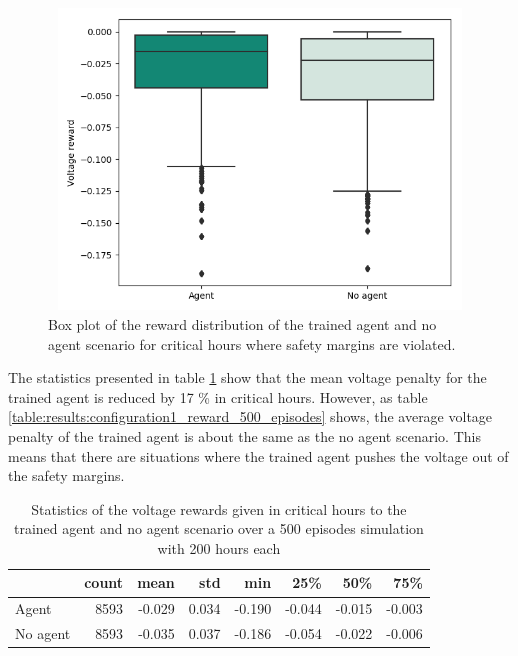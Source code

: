 \documentclass[class=book, crop=false]{standalone}
\begin{document}
\begin{figure}[H]
    \center
\includegraphics[height=8cm, width=12cm]{figures/config1_voltage_boxplot.png}
    \caption[size = 9]{Box plot of the reward distribution of the trained agent and no agent scenario for critical hours where safety margins are violated.}
    \label{fig:results:config1_voltage_boxplot}
\end{figure}

The statistics presented in table \ref{table:results:configuration1_reward_500_ep_preventive} show that the mean voltage penalty for the trained agent is reduced by 17 \% in critical hours. However, as table
\ref{table:results:configuration1_reward_500_episodes} shows, the average voltage penalty of the trained agent is about the same as the no agent scenario. This means that there are situations where the trained agent pushes the voltage out of the safety margins.    


\begin{table}[h]
\center
\begin{tabular}{l|rrrrrrr}
         & count & mean   & std   & min    & 25\%   & 50\%   & 75\%   \\
\hline
Agent    & 8593 & -0.029 & 0.034 & -0.190 & -0.044 & -0.015 & -0.003 \\
No agent & 8593 & -0.035 & 0.037 & -0.186 & -0.054 & -0.022 & -0.006 \\
\hline
\end{tabular}
\caption{Statistics of the voltage rewards given in critical hours to the trained agent and no agent scenario over a 500 episodes simulation with 200 hours each}
\label{table:results:configuration1_reward_500_ep_preventive}
\end{table}
\end{document}
